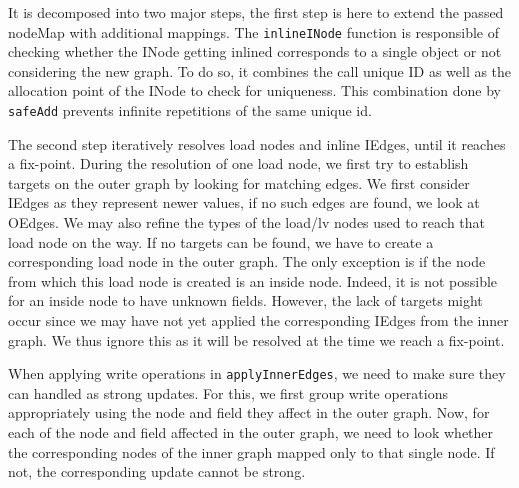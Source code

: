 \documentclass[a4paper]{article}
\begin{document}
It is decomposed into two major steps, the first step is here to extend the
passed nodeMap with additional mappings. The \verb=inlineINode= function is
responsible of checking whether the INode getting inlined corresponds to a
single object or not considering the new graph. To do so, it combines the call
unique ID as well as the allocation point of the INode to check for uniqueness.
This combination done by \verb=safeAdd= prevents infinite repetitions of the
same unique id.

The second step iteratively resolves load nodes and inline IEdges, until it
reaches a fix-point. During the resolution of one load node, we first try to
establish targets on the outer graph by looking for matching edges. We first
consider IEdges as they represent newer values, if no such edges are found,
we look at OEdges. We may also refine the types of the load/lv nodes used to
reach that load node on the way. If no targets can be found, we have to create
a corresponding load node in the outer graph. The only exception is if the node
from which this load node is created is an inside node. Indeed, it is not
possible for an inside node to have unknown fields. However, the lack of
targets might occur since we may have not yet applied the corresponding IEdges
from the inner graph. We thus ignore this as it will be resolved at the time we
reach a fix-point.

When applying write operations in \verb=applyInnerEdges=, we need to make sure
they can handled as strong updates. For this, we first group write operations
appropriately using the node and field they affect in the outer graph. Now, for
each of the node and field affected in the outer graph, we need to look whether
the corresponding nodes of the inner graph mapped only to that single node. If
not, the corresponding update cannot be strong.
\end{document}
